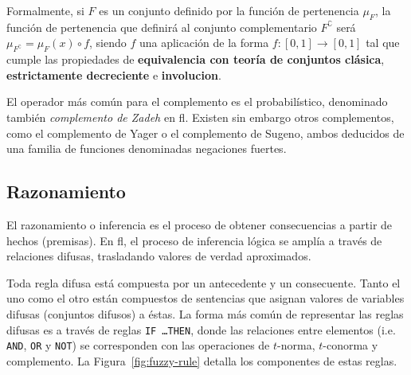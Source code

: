 Formalmente, si $F$ es un conjunto definido por la función de pertenencia $\mu_F$, la función de pertenencia que definirá al conjunto complementario $F^\complement$ será $\mu_{F^\complement} = \mu_F(x) \circ f$, siendo $f$ una aplicación de la forma $f : [0,1] \rightarrow [0,1]$ tal que cumple las propiedades de \textbf{equivalencia con teoría de conjuntos clásica}, \textbf{estrictamente decreciente} e \textbf{involucion}.

El operador más común para el complemento es el probabilístico, denominado también \textit{complemento de Zadeh} en \ac{fl}. Existen sin embargo otros complementos, como el complemento de Yager o el complemento de Sugeno, ambos deducidos de una familia de funciones denominadas negaciones fuertes.

\subsection{Razonamiento}

El razonamiento o inferencia es el proceso de obtener consecuencias a partir de hechos (premisas). En \ac{fl}, el proceso de inferencia lógica se amplía a través de relaciones difusas, trasladando valores de verdad aproximados.

Toda regla difusa está compuesta por un antecedente y un consecuente. Tanto el uno como el otro están compuestos de sentencias que asignan valores de variables difusas (conjuntos difusos) a éstas. La forma más común de representar las reglas difusas es a través de reglas \texttt{IF \ldots THEN}, donde las relaciones entre elementos (i.e. \texttt{AND}, \texttt{OR} y \texttt{NOT}) se corresponden con las operaciones de $t$-norma, $t$-conorma y complemento. La Figura~\ref{fig:fuzzy-rule} detalla los componentes de estas reglas.

